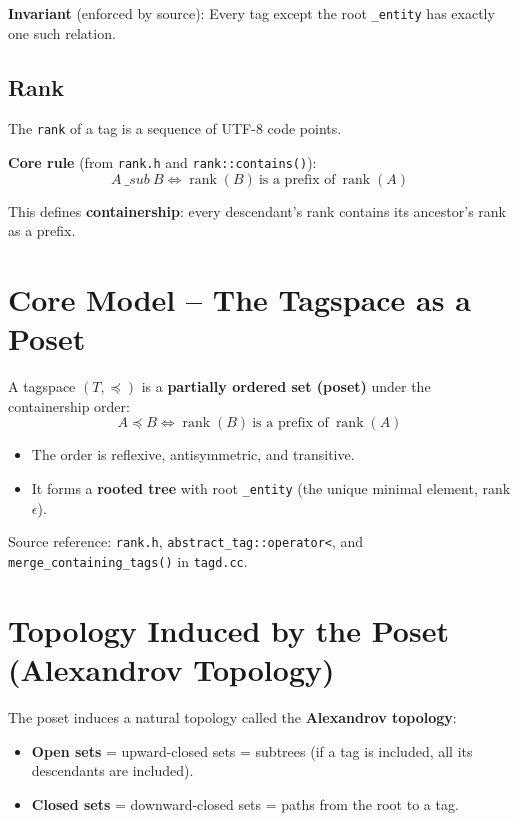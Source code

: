 \documentclass[11pt,a4paper]{article}
\begin{document}
\textbf{Invariant} (enforced by source): Every tag except the root \texttt{\_entity} has exactly one such relation.

\subsection{Rank}
The \texttt{rank} of a tag is a sequence of UTF-8 code points.

\textbf{Core rule} (from \texttt{rank.h} and \texttt{rank::contains()}):
\[
A\ \_sub\ B \iff \operatorname{rank}(B)\ \text{is a prefix of}\ \operatorname{rank}(A)
\]

This defines \textbf{containership}: every descendant’s rank contains its ancestor’s rank as a prefix.

\section{Core Model -- The Tagspace as a Poset}

A tagspace \( (T, \preceq) \) is a \textbf{partially ordered set (poset)} under the containership order:
\[
A \preceq B \iff \operatorname{rank}(B)\ \text{is a prefix of}\ \operatorname{rank}(A)
\]

\begin{itemize}
    \item The order is reflexive, antisymmetric, and transitive.
    \item It forms a \textbf{rooted tree} with root \texttt{\_entity} (the unique minimal element, rank \( \epsilon \)).
\end{itemize}

Source reference: \texttt{rank.h}, \texttt{abstract\_tag::operator<}, and \texttt{merge\_containing\_tags()} in \texttt{tagd.cc}.

\section{Topology Induced by the Poset (Alexandrov Topology)}

The poset induces a natural topology called the \textbf{Alexandrov topology}:

\begin{itemize}
    \item \textbf{Open sets} = upward-closed sets = subtrees (if a tag is included, all its descendants are included).
    \item \textbf{Closed sets} = downward-closed sets = paths from the root to a tag.
\end{itemize}
\end{document}
